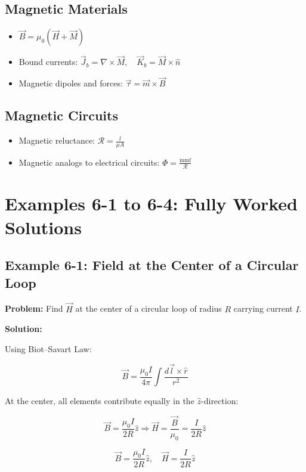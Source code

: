 \documentclass[12pt]{article}
\begin{document}
\subsection*{Magnetic Materials}
\begin{itemize}
  \item \( \vec{B} = \mu_0 (\vec{H} + \vec{M}) \)
  \item Bound currents: \( \vec{J}_b = \nabla \times \vec{M}, \quad \vec{K}_b = \vec{M} \times \hat{n} \)
  \item Magnetic dipoles and forces: \( \vec{\tau} = \vec{m} \times \vec{B} \)
\end{itemize}

\subsection*{Magnetic Circuits}
\begin{itemize}
  \item Magnetic reluctance: \( \mathcal{R} = \frac{l}{\mu A} \)
  \item Magnetic analogs to electrical circuits: \( \Phi = \frac{\text{mmf}}{\mathcal{R}} \)
\end{itemize}

\newpage


\section*{Examples 6-1 to 6-4: Fully Worked Solutions}

\subsection*{Example 6-1: Field at the Center of a Circular Loop}

\textbf{Problem:}  
Find \( \vec{H} \) at the center of a circular loop of radius \( R \) carrying current \( I \).

\textbf{Solution:}

Using Biot–Savart Law:

\[
\vec{B} = \frac{\mu_0 I}{4\pi} \int \frac{d\vec{l} \times \hat{r}}{r^2}
\]

At the center, all elements contribute equally in the \( \hat{z} \)-direction:

\[
\vec{B} = \frac{\mu_0 I}{2R} \hat{z}
\Rightarrow \vec{H} = \frac{\vec{B}}{\mu_0} = \frac{I}{2R} \hat{z}
\]

\begin{tcolorbox}
\[
\boxed{\vec{B} = \frac{\mu_0 I}{2R} \hat{z}}, \quad
\boxed{\vec{H} = \frac{I}{2R} \hat{z}}
\]
\end{tcolorbox}
\end{document}
